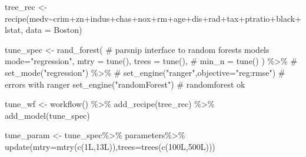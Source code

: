 \documentclass[
  letterpaper,
  DIV=11,
  numbers=noendperiod]{scrartcl}
\newenvironment{Shaded}{\begin{snugshade}}{\end{snugshade}}
\newcommand{\AttributeTok}[1]{\textcolor[rgb]{0.40,0.45,0.13}{#1}}
\newcommand{\CommentTok}[1]{\textcolor[rgb]{0.37,0.37,0.37}{#1}}
\newcommand{\FunctionTok}[1]{\textcolor[rgb]{0.28,0.35,0.67}{#1}}
\newcommand{\NormalTok}[1]{\textcolor[rgb]{0.00,0.23,0.31}{#1}}
\newcommand{\OtherTok}[1]{\textcolor[rgb]{0.00,0.23,0.31}{#1}}
\newcommand{\SpecialCharTok}[1]{\textcolor[rgb]{0.37,0.37,0.37}{#1}}
\newcommand{\StringTok}[1]{\textcolor[rgb]{0.13,0.47,0.30}{#1}}
\begin{document}
\begin{Shaded}
\begin{Highlighting}[]
\NormalTok{tree\_rec }\OtherTok{\textless{}{-}} \FunctionTok{recipe}\NormalTok{(medv}\SpecialCharTok{\textasciitilde{}}\NormalTok{crim}\SpecialCharTok{+}\NormalTok{zn}\SpecialCharTok{+}\NormalTok{indus}\SpecialCharTok{+}\NormalTok{chas}\SpecialCharTok{+}\NormalTok{nox}\SpecialCharTok{+}\NormalTok{rm}\SpecialCharTok{+}\NormalTok{age}\SpecialCharTok{+}\NormalTok{dis}\SpecialCharTok{+}\NormalTok{rad}\SpecialCharTok{+}\NormalTok{tax}\SpecialCharTok{+}\NormalTok{ptratio}\SpecialCharTok{+}\NormalTok{black}\SpecialCharTok{+}\NormalTok{lstat, }\AttributeTok{data =}\NormalTok{ Boston)}

\NormalTok{tune\_spec }\OtherTok{\textless{}{-}} \FunctionTok{rand\_forest}\NormalTok{( }\CommentTok{\# parsnip interface to random forests models}
  \AttributeTok{mode=}\StringTok{"regression"}\NormalTok{,}
  \AttributeTok{mtry =} \FunctionTok{tune}\NormalTok{(),}
  \AttributeTok{trees =} \FunctionTok{tune}\NormalTok{(),}
\CommentTok{\#  min\_n = tune()}
\NormalTok{) }\SpecialCharTok{\%\textgreater{}\%}
\CommentTok{\#  set\_mode("regression") \%\textgreater{}\%}
\CommentTok{\#  set\_engine("ranger",objective="reg:rmse") \# errors with ranger}
  \FunctionTok{set\_engine}\NormalTok{(}\StringTok{"randomForest"}\NormalTok{) }\CommentTok{\# randomforest ok}

\NormalTok{tune\_wf }\OtherTok{\textless{}{-}} \FunctionTok{workflow}\NormalTok{() }\SpecialCharTok{\%\textgreater{}\%}
  \FunctionTok{add\_recipe}\NormalTok{(tree\_rec) }\SpecialCharTok{\%\textgreater{}\%}
  \FunctionTok{add\_model}\NormalTok{(tune\_spec)}

\NormalTok{tune\_param }\OtherTok{\textless{}{-}}\NormalTok{ tune\_spec}\SpecialCharTok{\%\textgreater{}\%} 
\NormalTok{  parameters}\SpecialCharTok{\%\textgreater{}\%} 
  \FunctionTok{update}\NormalTok{(}\AttributeTok{mtry=}\FunctionTok{mtry}\NormalTok{(}\FunctionTok{c}\NormalTok{(1L,13L)),}\AttributeTok{trees=}\FunctionTok{trees}\NormalTok{(}\FunctionTok{c}\NormalTok{(100L,500L)))}


\end{Highlighting}
\end{Shaded}
\end{document}
